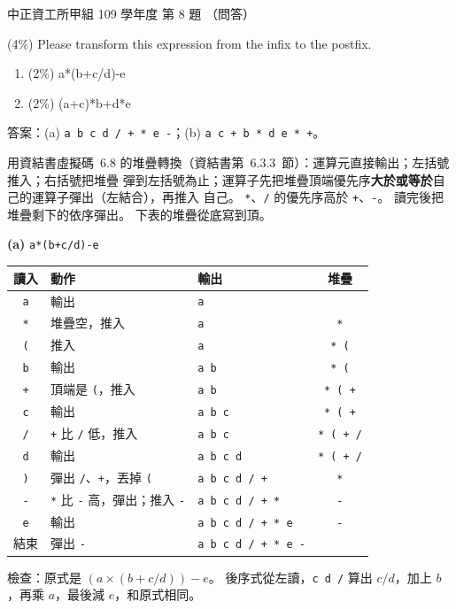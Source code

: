 \begin{pastexam}[label={px:ccu-109-swa-03}]{中正資工所甲組 109 學年度 第 8 題}
（問答）

(4\%) Please transform this expression from the infix to the postfix.
\begin{enumerate}[label=(\alph*)]
\item (2\%) a*(b+c/d)-e
\item (2\%) (a+c)*b+d*e
\end{enumerate}
\end{pastexam}

\begin{pastsoln}
答案：(a) \texttt{a b c d / + * e -}；(b) \texttt{a c + b * d e * +}。

用資結書虛擬碼~6.8 的堆疊轉換（資結書第~6.3.3~節）：運算元直接輸出；左括號推入；右括號把堆疊
彈到左括號為止；運算子先把堆疊頂端優先序\textbf{大於或等於}自己的運算子彈出（左結合），再推入
自己。 \texttt{*}、\texttt{/} 的優先序高於 \texttt{+}、\texttt{-}。 讀完後把堆疊剩下的依序彈出。
下表的堆疊從底寫到頂。

\textbf{(a)} \texttt{a*(b+c/d)-e}
\begin{center}
\small
\begin{tabular}{cllc}
\toprule
讀入 & 動作 & 輸出 & 堆疊 \\
\midrule
\texttt{a} & 輸出 & \texttt{a} & \\
\texttt{*} & 堆疊空，推入 & \texttt{a} & \texttt{*} \\
\texttt{(} & 推入 & \texttt{a} & \texttt{* (} \\
\texttt{b} & 輸出 & \texttt{a b} & \texttt{* (} \\
\texttt{+} & 頂端是 \texttt{(}，推入 & \texttt{a b} & \texttt{* ( +} \\
\texttt{c} & 輸出 & \texttt{a b c} & \texttt{* ( +} \\
\texttt{/} & \texttt{+} 比 \texttt{/} 低，推入 & \texttt{a b c} & \texttt{* ( + /} \\
\texttt{d} & 輸出 & \texttt{a b c d} & \texttt{* ( + /} \\
\texttt{)} & 彈出 \texttt{/}、\texttt{+}，丟掉 \texttt{(} & \texttt{a b c d / +} & \texttt{*} \\
\texttt{-} & \texttt{*} 比 \texttt{-} 高，彈出；推入 \texttt{-} & \texttt{a b c d / + *} & \texttt{-} \\
\texttt{e} & 輸出 & \texttt{a b c d / + * e} & \texttt{-} \\
結束 & 彈出 \texttt{-} & \texttt{a b c d / + * e -} & \\
\bottomrule
\end{tabular}
\end{center}
檢查：原式是 $(a \times (b + c / d)) - e$。 後序式從左讀，\texttt{c d /} 算出 $c/d$，加上 $b$，再乘
$a$，最後減 $e$，和原式相同。


\end{pastsoln}
